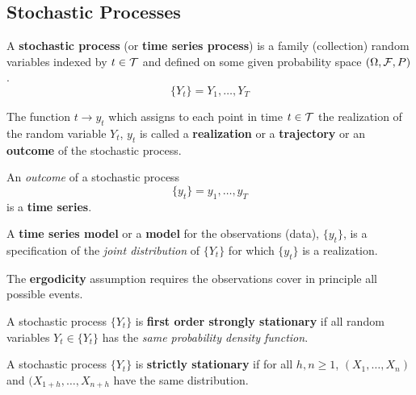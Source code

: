 \documentclass[11pt]{article}
\begin{document}
		\subsection{Stochastic Processes}
		\begin{definition}[1.1]
			A \textbf{stochastic process} (or \textbf{time series process}) is a family (collection) random variables indexed by $t \in \mathcal{{T}}$ and defined on some given probability space $(\Omega, \mathcal{{F}}, P)$.
			\begin{equation}
				\{Y_t\} = Y_1, \dots, Y_T
			\end{equation}
		\end{definition}
		
		\begin{definition}[1.2]
			The function $t \to y_t$ which assigns to each point in time $t \in \mathcal{{T}}$ the realization of the random variable $Y_t$, $y_t$ is called a \textbf{realization} or a \textbf{trajectory} or an \textbf{outcome} of the stochastic process.
		\end{definition}
		
		\begin{definition}
			An \emph{outcome} of a stochastic process 
			\begin{equation}
				\{y_t\} = y_1, \dots, y_T
			\end{equation}
			is a \textbf{time series}.
		\end{definition}
		
		\begin{definition}[1.3]
			A \textbf{time series model} or a \textbf{model} for the observations (data), $\{y_t\}$, is a specification of the \emph{joint distribution} of $\{Y_t\}$ for which $\{y_t\}$ is a realization.
		\end{definition}
		
		\begin{assumption}
			The \textbf{ergodicity} assumption requires the observations cover in principle all possible events.
		\end{assumption}
		
		\begin{definition}
			A stochastic process $\{Y_t\}$ is \textbf{first order strongly stationary} if all random variables $Y_t \in \{Y_t\}$ has the \emph{same probability density function}.
		\end{definition}
		
		\begin{definition}[1.7]
			A stochastic process $\{Y_t\}$ is \textbf{strictly stationary} if for all $h, n \geq 1$, $(X_1,\dots,X_n)$ and $(X_{1+h}, \dots, X_{n+h}$ have the same distribution.
		\end{definition}
		
\end{document}
